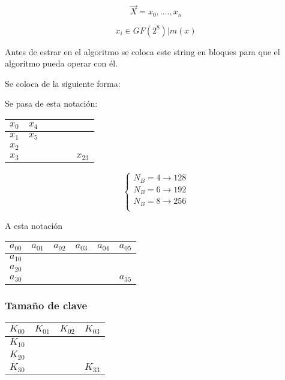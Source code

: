 $$\overrightarrow{X} = x_0 , ...., x_n$$

$$x_i \in GF(2^8)|m(x)$$

Antes de estrar en el algoritmo se coloca este string en bloques para que el algoritmo pueda operar con él.

Se coloca de la siguiente forma:

Se pasa de esta notación:

	\begin{center}
		\begin{tabular}{l | l | c | r | r | r}
			$x_0$ & $x_4$ &  &  &  &  \\
			\hline
			$x_1$  & $x_5$ &  &  &  &  \\
			\hline
			$x_2$  &  &  &  &  &  \\
			\hline
			$x_3$ &  &  &  &  & $x_{23}$ \\
		\end{tabular}
	\end{center}
	
	$$\begin{cases}
	N_B = 4 \rightarrow 128\\
	N_B = 6 \rightarrow 192\\
	N_B = 8 \rightarrow 256\\
	\end{cases}$$

A esta notación	


	\begin{center}
		
		\begin{tabular}{l | c | r | r | r | r}
			$a_{00}$ & $a_{01}$ & $a_{02}$ & $a_{03}$ & $a_{04}$ & $a_{05}$\\
			\hline
			$a_{10}$ &   &   &   &   &  \\
			\hline
			$a_{20}$ &   &   &   &   &  \\
			\hline
			$a_{30}$ &   &   &   &   & $a_{35}$
			
		\end{tabular}
	\end{center}


\subsubsection{Tamaño de clave}

	\begin{center}
		
		\begin{tabular}{l | c | r | r }
		$K_{00}$ & $K_{01}$ & $K_{02}$ & $K_{03}$\\
		\hline
		$K_{10}$ &  &  & \\
		\hline
		$K_{20}$ &  &  & \\
		\hline
		$K_{30}$ &  &  & $K_{33}$
		
		\end{tabular}
	\end{center}
	
